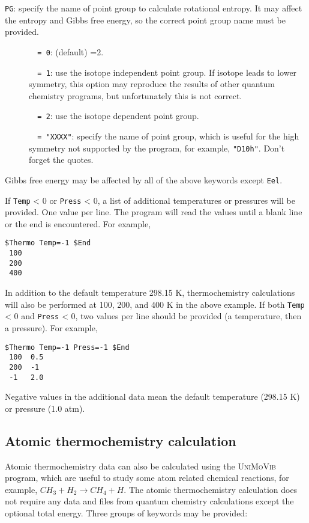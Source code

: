 \documentclass[12pt,english]{extarticle}
\begin{document}
\bigskip{}
\verb|PG|: specify the name of point group to calculate rotational
entropy. It may affect the entropy and Gibbs free energy, so the correct point group
name must be provided.
\begin{description}
\item[ ]\verb|  = 0|: (default) =2.
\item[ ]\verb|  = 1|: use the isotope independent point group. If isotope leads to lower symmetry, this option may
reproduce the results of other quantum chemistry programs, but unfortunately this is
not correct.
\item[ ]\verb|  = 2|: use the isotope dependent point group.
\item[ ]\verb|  = "XXXX"|: specify the name of point group, which is useful for the high symmetry not supported by the program, for example, \verb|"D10h"|. Don't forget the quotes.
\end{description}

Gibbs free energy may be affected by all of the above keywords except \verb|Eel|.

If \verb|Temp| < 0 or \verb|Press| < 0, a list of additional temperatures or pressures will be provided. One value per line. The program will
read the values until a blank line or the end is encountered.
For example,
\begin{Verbatim}[frame=single]
 $Thermo Temp=-1 $End
 100
 200
 400
\end{Verbatim}
In addition to the default temperature 298.15 K, thermochemistry calculations will also be performed at 100, 200, and 400 K in the above example. If both \verb|Temp| < 0 and \verb|Press| < 0, two values per line should be provided (a temperature, then a pressure). For example,
\begin{Verbatim}[frame=single]
 $Thermo Temp=-1 Press=-1 $End
 100  0.5
 200  -1
 -1   2.0
\end{Verbatim}
Negative values in the additional data mean the default temperature (298.15 K) or pressure (1.0 atm).

\subsection{Atomic thermochemistry calculation} \label{sec:inp-atom}

Atomic thermochemistry data can also be calculated using the \textsc{UniMoVib} program, which are useful to
study some atom related chemical reactions, for example, $CH_3 + H_2 \rightarrow CH_4 + H$. The atomic
thermochemistry calculation does not require any data and files from quantum chemistry calculations except the
optional total energy. Three groups of keywords may be provided:
\end{document}
